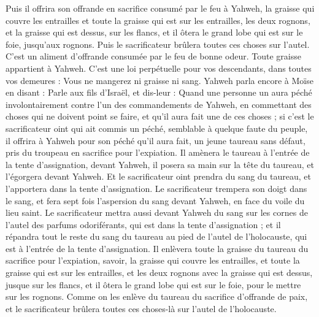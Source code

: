 \begin{multicols}{2}
Puis il offrira son offrande en sacrifice consumé par le feu à Yahweh, la graisse qui couvre les entrailles et toute la graisse qui est sur les entrailles,
les deux rognons, et la graisse qui est dessus, sur les flancs, et il ôtera le grand lobe qui est sur le foie, jusqu'aux rognons.
Puis le sacrificateur brûlera toutes ces choses sur l'autel. C'est un aliment d'offrande consumée par le feu de bonne odeur. Toute graisse appartient à Yahweh.
C'est une loi perpétuelle pour vos descendants, dans toutes vos demeures : Vous ne mangerez ni graisse ni sang.
\VerseOne{}Yahweh parla encore à Moïse en disant :
Parle aux fils d'Israël, et dis-leur : Quand une personne un aura péché involontairement contre l'un des commandements de Yahweh, en commettant des choses qui ne doivent point se faire, et qu'il aura fait une de ces choses ;
 si c'est le sacrificateur oint qui ait commis un péché, semblable à quelque faute du peuple, il offrira à Yahweh pour son péché qu'il aura fait, un jeune taureau sans défaut, pris du troupeau en sacrifice pour l'expiation.
Il amènera le taureau à l'entrée de la tente d'assignation, devant Yahweh, il posera sa main sur la tête du taureau, et l'égorgera devant Yahweh.
Et le sacrificateur oint prendra du sang du taureau, et l'apportera dans la tente d'assignation.
Le sacrificateur trempera son doigt dans le sang, et fera sept fois l'aspersion du sang devant Yahweh, en face du voile du lieu saint.
Le sacrificateur mettra aussi devant Yahweh du sang sur les cornes de l'autel des parfums odoriférants, qui est dans la tente d'assignation ; et il répandra tout le reste du sang du taureau au pied de l'autel de l'holocauste, qui est à l'entrée de la tente d'assignation.
Il enlèvera toute la graisse du taureau du sacrifice pour l'expiation, savoir, la graisse qui couvre les entrailles, et toute la graisse qui est sur les entrailles,
et les deux rognons avec la graisse qui est dessus, jusque sur les flancs, et il ôtera le grand lobe qui est sur le foie, pour le mettre sur les rognons.
Comme on les enlève du taureau du sacrifice d'offrande de paix, et le sacrificateur brûlera toutes ces choses-là sur l'autel de l'holocauste.

\end{multicols}
